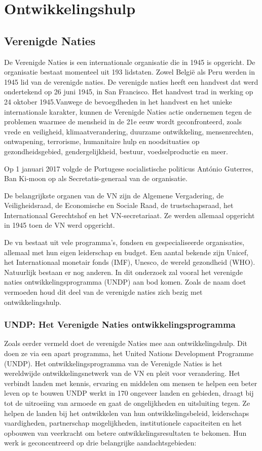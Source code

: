 \section{Ontwikkelingshulp}

\subsection{Verenigde Naties}
De Verenigde Naties is een internationale organisatie die in 1945 is opgericht. De organisatie bestaat momenteel uit 193 lidstaten. Zowel België als Peru werden in 1945 lid van de verenigde naties. De verenigde naties heeft een handvest dat werd ondertekend op 26 juni 1945, in San Francisco. Het handvest trad in werking op 24 oktober 1945.Vanwege de bevoegdheden in het handvest en het unieke internationale karakter, kunnen de Verenigde Naties actie ondernemen tegen de problemen waarmee de mensheid in de 21e eeuw wordt geconfronteerd, zoals vrede en veiligheid, klimaatverandering, duurzame ontwikkeling, mensenrechten, ontwapening, terrorisme, humanitaire hulp en noodsituaties op gezondheidsgebied, gendergelijkheid, bestuur, voedselproductie en meer. \autocite{Nations2020}

Op 1 januari 2017 volgde de Portugese socialistische politicus António Guterres, Ban Ki-moon op als Secretatis-generaal van de organisatie. 

De belangrijkste organen van de VN zijn de Algemene Vergadering, de Veiligheidsraad, de Economische en Sociale Raad, de trustschapsraad, het Internationaal Gerechtshof en het VN-secretariaat. Ze werden allemaal opgericht in 1945 toen de VN werd opgericht. 

De vn bestaat uit vele programma's, fondsen en gespecialiseerde organisaties, allemaal met hun eigen leiderschap en budget. Een aantal bekende zijn Unicef, het Internationaal monetair fonds (IMF), Unesco, de wereld gezondheid (WHO). Natuurlijk bestaan er nog anderen. In dit onderzoek zal vooral het verenigde naties ontwikkelingsprogramma (UNDP) aan bod komen. Zoals de naam doet vermoeden houd dit deel van de verenigde naties zich bezig met ontwikkelingshulp.

\subsubsection{UNDP: Het Verenigde Naties ontwikkelingsprogramma}
Zoals eerder vermeld doet de verenigde Naties mee aan ontwikkelingshulp. Dit doen ze via een apart programma, het United Nations Development Programme (UNDP). Het ontwikkelingsprogramma van de Verenigde Naties is het wereldwijde ontwikkelingsnetwerk van de VN en pleit voor verandering. Het verbindt landen met kennis, ervaring en middelen om mensen te helpen een beter leven op te bouwen UNDP werkt in 170 ongeveer landen en gebieden, draagt bij tot de uitroeiing van armoede en gaat de ongelijkheden en uitsluiting tegen. Ze helpen de landen bij het ontwikkelen van hun ontwikkelingsbeleid, leiderschaps vaardigheden, partnerschap mogelijkheden, institutionele capaciteiten en het opbouwen van veerkracht om betere ontwikkelingsresultaten te bekomen. \autocite{DevelopmentProgram2020}
Hun werk is geconcentreerd op drie belangrijke aandachtsgebieden:

